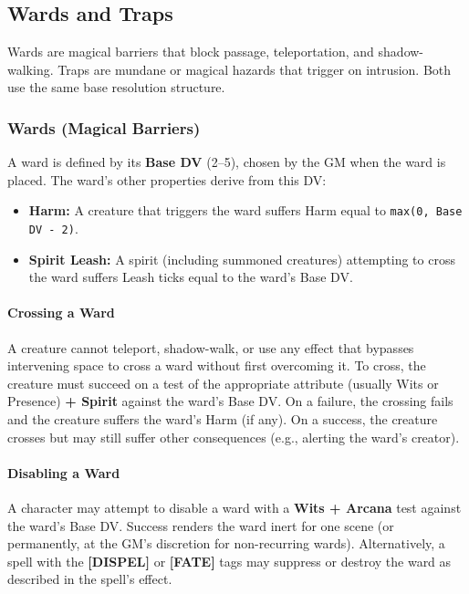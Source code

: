 \subsection{Wards and Traps}

Wards are magical barriers that block passage, teleportation, and shadow-walking. Traps are mundane or magical hazards that trigger on intrusion. Both use the same base resolution structure.

\subsubsection{Wards (Magical Barriers)}

A ward is defined by its \textbf{Base DV} (2--5), chosen by the GM when the ward is placed. The ward's other properties derive from this DV:

\begin{itemize}
    \item \textbf{Harm:} A creature that triggers the ward suffers Harm equal to \texttt{max(0, Base DV - 2)}.
    \item \textbf{Spirit Leash:} A spirit (including summoned creatures) attempting to cross the ward suffers Leash ticks equal to the ward's Base DV.
\end{itemize}

\paragraph{Crossing a Ward}
A creature cannot teleport, shadow-walk, or use any effect that bypasses intervening space to cross a ward without first overcoming it. To cross, the creature must succeed on a test of the appropriate attribute (usually Wits or Presence) \textbf{+ Spirit} against the ward's Base DV. On a failure, the crossing fails and the creature suffers the ward's Harm (if any). On a success, the creature crosses but may still suffer other consequences (e.g., alerting the ward's creator).

\paragraph{Disabling a Ward}
A character may attempt to disable a ward with a \textbf{Wits + Arcana} test against the ward's Base DV. Success renders the ward inert for one scene (or permanently, at the GM's discretion for non-recurring wards). Alternatively, a spell with the \textbf{[DISPEL]} or \textbf{[FATE]} tags may suppress or destroy the ward as described in the spell's effect.

